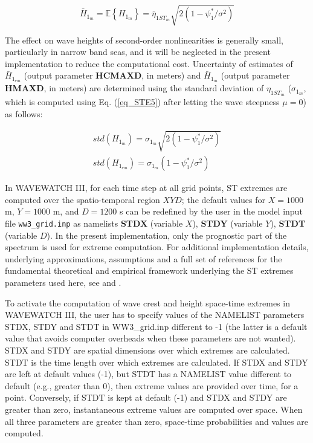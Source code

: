 \begin{equation}
\bar{H}_{1_m}=\mathbb{E}\left\{H_{1_m} \right\} = \bar{\eta}_{1ST_m}\sqrt{2(1-\psi_1^* / \sigma^2)}
\label{eq_STE8}
\end{equation}

The effect on wave heights of second-order nonlinearities is generally small, particularly in narrow band seas, and it will be neglected in the present implementation to reduce the computational cost. Uncertainty of estimates of $\bar{H}_{1_{cm}}$ (output parameter \textbf{HCMAXD}, in meters) and $\bar{H}_{1_m}$ (output parameter \textbf{HMAXD}, in meters) are determined using the standard deviation of $\eta_{1ST_m}$ ($\sigma_{1_m}$, which is computed using Eq. (\ref{eq_STE5}) after letting the wave steepness $\mu=0$) as follows:

\begin{eqnarray}
std({H}_{1_m})=\sigma_{1_m}\sqrt{2(1-\psi_1^* / \sigma^2)} \nonumber \\
std({H}_{1_{cm}})=\sigma_{1_m}(1-\psi_1^* / \sigma^2)
\label{eq_STE9}
\end{eqnarray}

In WAVEWATCH III, for each time step at all grid points, ST extremes are computed over the spatio-temporal region $XYD$; the default values for $X = 1000$ m, $Y = 1000$ m, and $D = 1200$ s can be redefined by the user in the model input file \texttt{ww3\_grid.inp} as namelists \textbf{STDX} (variable $X$), \textbf{STDY} (variable $Y$), \textbf{STDT} (variable $D$). In the present implementation, only the prognostic part of the spectrum is used for extreme computation. For additional implementation details, underlying approximations, assumptions and a full set of references for the fundamental theoretical and empirical framework underlying the ST extremes parameters used here, see \cite{Fed12sp} and \cite{Baet16}.

To activate the computation of wave crest and height space-time extremes in WAVEWATCH III, the user has to specify values of the NAMELIST parameters STDX, STDY and STDT in WW3\_grid.inp different to -1 (the latter is a default value that avoids computer overheads when these parameters are not wanted). STDX and STDY are spatial dimensions over which extremes are calculated. STDT is the time length over which extremes are calculated. If STDX and STDY are left at default values (-1), but STDT has a NAMELIST value different to default (e.g., greater than 0), then extreme values are provided over time, for a point. Conversely, if STDT is kept at default (-1) and STDX and STDY are greater than zero, instantaneous extreme values are computed over space. When all three parameters are greater than zero, space-time probabilities and values are computed.

